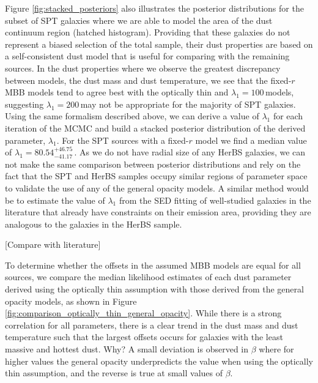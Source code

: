 Figure \ref{fig:stacked_posteriors} also illustrates the posterior distributions for the subset of SPT galaxies where we are able to model the area of the dust continuum region (hatched histogram). Providing that these galaxies do not represent a biased selection of the total sample, their dust properties are based on a self-consistent dust model that is useful for comparing with the remaining sources. In the dust properties where we observe the greatest discrepancy between models, the dust mass and dust temperature, we see that the fixed-$r$ MBB models tend to agree best with the optically thin and $\lambda_1 = 100$\,\micron models, suggesting $\lambda_1 = 200$\,\micron may not be appropriate for the majority of SPT galaxies. Using the same formalism described above, we can derive a value of $\lambda_1$ for each iteration of the MCMC and build a stacked posterior distribution of the derived parameter, $\lambda_1$. For the SPT sources with a fixed-$r$ model we find a median value of $\lambda_1 = 80.54_{-41.17}^{+46.75}$\,\micron. As we do not have radial size of any HerBS galaxies, we can not make the same comparison between posterior distributions and rely on the fact that the SPT and HerBS samples occupy similar regions of parameter space to validate the use of any of the general opacity models. A similar method would be to estimate the value of $\lambda_1$ from the SED fitting of well-studied galaxies in the literature that already have constraints on their emission area, providing they are analogous to the galaxies in the HerBS sample. 

{\color{red} [Compare with literature]}

To determine whether the offsets in the assumed MBB models are equal for all sources, we compare the median likelihood estimates of each dust parameter derived using the optically thin assumption with those derived from the general opacity models, as shown in Figure \ref{fig:comparison_optically_thin_general_opacity}. While there is a strong correlation for all parameters, there is a clear trend in the dust mass and dust temperature such that the largest offsets occurs for galaxies with the least massive and hottest dust. {\color{red} Why?} A small deviation is observed in $\beta$ where for higher values the general opacity underpredicts the value when using the optically thin assumption, and the reverse is true at small values of $\beta$.

